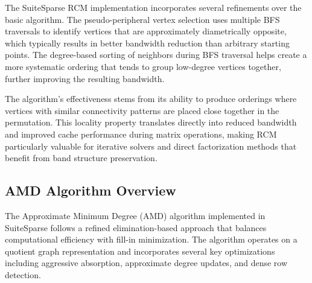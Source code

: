 The SuiteSparse RCM implementation incorporates several refinements over the basic algorithm. The pseudo-peripheral vertex selection uses multiple BFS traversals to identify vertices that are approximately diametrically opposite, which typically results in better bandwidth reduction than arbitrary starting points. The degree-based sorting of neighbors during BFS traversal helps create a more systematic ordering that tends to group low-degree vertices together, further improving the resulting bandwidth.

The algorithm's effectiveness stems from its ability to produce orderings where vertices with similar connectivity patterns are placed close together in the permutation. This locality property translates directly into reduced bandwidth and improved cache performance during matrix operations, making RCM particularly valuable for iterative solvers and direct factorization methods that benefit from band structure preservation.

\subsection{AMD Algorithm Overview}

The Approximate Minimum Degree (AMD) algorithm implemented in SuiteSparse follows a refined elimination-based approach that balances computational efficiency with fill-in minimization. The algorithm operates on a quotient graph representation and incorporates several key optimizations including aggressive absorption, approximate degree updates, and dense row detection.

